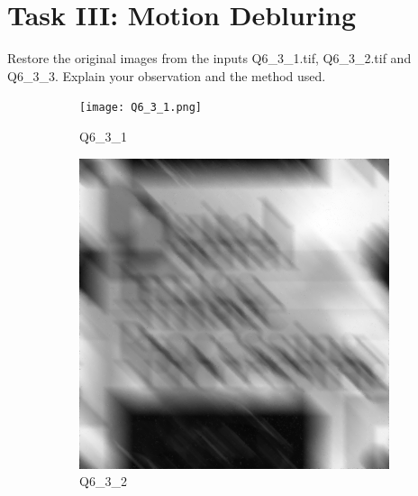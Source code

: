 \documentclass[
	12pt, %
]{style/fphw}
\begin{document}
	

\section*{Task III: Motion Debluring}

\begin{problem}
	Restore the original images from the inputs Q6\_3\_1.tif, Q6\_3\_2.tif and Q6\_3\_3. Explain your observation and the method used.

	\begin{figure}[H]
		\centering
		\begin{subfigure}[b]{.3\textwidth}
			\centering
			\texttt{[image: Q6\_3\_1.png]}
			\caption{Q6\_3\_1}
			\label{Q6_3_1}
		\end{subfigure}
		\hfill
		\begin{subfigure}[b]{.3\textwidth}
			\centering
			\includegraphics[width=0.9\linewidth]{Q6_3_2.png}
			\caption{Q6\_3\_2}
			\label{Q6_3_2}
		\end{subfigure}
		\hfill
		\begin{subfigure}[b]{.3\textwidth}
			\centering

\end{subfigure}
\end{figure}
\end{problem}
\end{document}
